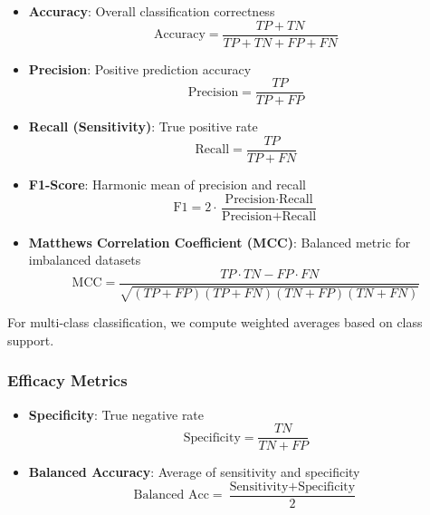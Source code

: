 \documentclass[runningheads]{llncs}
\begin{document}
\begin{itemize}
    \item \textbf{Accuracy}: Overall classification correctness
    \begin{equation}
    \text{Accuracy} = \frac{TP + TN}{TP + TN + FP + FN}
    \end{equation}
    
    \item \textbf{Precision}: Positive prediction accuracy
    \begin{equation}
    \text{Precision} = \frac{TP}{TP + FP}
    \end{equation}
    
    \item \textbf{Recall (Sensitivity)}: True positive rate
    \begin{equation}
    \text{Recall} = \frac{TP}{TP + FN}
    \end{equation}
    
    \item \textbf{F1-Score}: Harmonic mean of precision and recall
    \begin{equation}
    \text{F1} = 2 \cdot \frac{\text{Precision} \cdot \text{Recall}}{\text{Precision} + \text{Recall}}
    \end{equation}
    
    \item \textbf{Matthews Correlation Coefficient (MCC)}: Balanced metric for imbalanced datasets
    \begin{equation}
    \text{MCC} = \frac{TP \cdot TN - FP \cdot FN}{\sqrt{(TP+FP)(TP+FN)(TN+FP)(TN+FN)}}
    \end{equation}
\end{itemize}

For multi-class classification, we compute weighted averages based on class support.

\subsubsection{Efficacy Metrics}

\begin{itemize}
    \item \textbf{Specificity}: True negative rate
    \begin{equation}
    \text{Specificity} = \frac{TN}{TN + FP}
    \end{equation}
    
    \item \textbf{Balanced Accuracy}: Average of sensitivity and specificity
    \begin{equation}
    \text{Balanced Acc} = \frac{\text{Sensitivity} + \text{Specificity}}{2}
    \end{equation}
\end{itemize}
\end{document}
